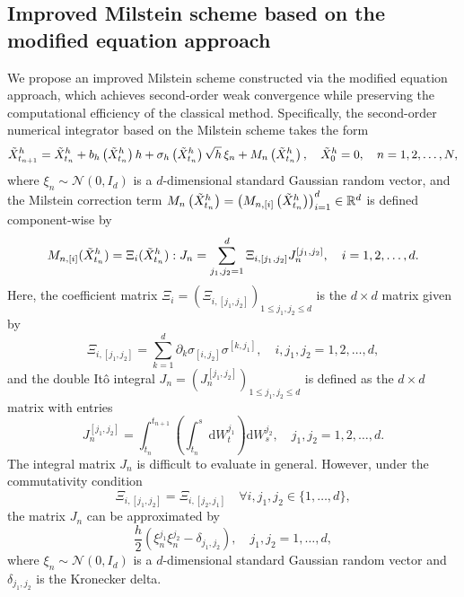 \documentclass[12pt,a4paper,reqno]{amsart}
\numberwithin{equation}{section}
\begin{document}
  

\subsection{Improved Milstein scheme based on the modified equation approach}

We propose an improved Milstein scheme constructed via the modified equation approach, which achieves second-order weak convergence while preserving the computational efficiency of the classical method. Specifically, the second-order numerical integrator based on the Milstein scheme takes the form 
\begin{equation}\label{Euler Maruyama with modified equation}
    \Tilde{X}_{t_{n+1}}^h = \Tilde{X}_{t_{n}}^h + b_{h}\left(\Tilde{X}_{t_{n}}^h\right)h + \sigma_{h}\left(\Tilde{X}_{t_n}^h\right)\sqrt{h}\,\xi_n + M_n\left(\Tilde{X}_{t_n}^h\right),\quad \tilde{X}_{0}^h = 0,\quad n= 1,2,\dotsc,N,
\end{equation}
where 
$\xi_n \sim \mathcal{N}(0,I_d)$ is a $d$-dimensional standard Gaussian random  vector, and the Milstein correction term $M_n\left(\Tilde{X}_{t_{n}}^h\right) = \left(M_{n,[i]}\left(\Tilde{X}_{t_{n}}^h\right)\right)_{i=1}^d \in \mathbb{R}^d$ is defined component-wise by
\begin{equation*}
    M_{n,[i]}(\Tilde{X}_{t_n}^h)  = \Xi_i(\Tilde{X}_{t_n}^h) : J_n = \sum_{j_1,j_2=1}^d \Xi_{i,[j_1,j_2]}J_n^{[j_1,j_2]},\quad i = 1,2,\dotsc,d.
\end{equation*}
Here, the coefficient matrix $\Xi_i = (\Xi_{i,[j_1,j_2]})_{1\leq j_1,j_2\leq d}$ is the $d\times d$ matrix given by
\begin{equation*}
    \Xi_{i,[j_1,j_2]} = \sum_{k=1}^d \partial_k\sigma_{[i,j_2]}\sigma^{[k,j_1]},\quad i,j_1,j_2 = 1,2,\dotsc,d,
\end{equation*}
and the double It\^{o} integral $J_n = (J_n^{[j_1,j_2]})_{1\leq j_1,j_2\leq d}$ is defined as the $d \times d$ matrix with entries  
\begin{equation*}
    J_n^{[j_1,j_2]} =  \int_{t_n}^{t_{n+1}}\left(\int_{t_n}^s \mathrm{d}W^{j_1}_t\right) \mathrm{d}W^{j_2}_s,\quad j_1,j_2 = 1,2,\dotsc,d.
\end{equation*}
The integral matrix $J_n$ is difficult to evaluate in general. However, under the commutativity condition
\begin{equation*}
	\Xi_{i,[j_1,j_2]} = \Xi_{i,[j_2,j_1]} \quad \forall i,j_1,j_2 \in \{1,\dots,d\},
\end{equation*}
the matrix $J_n$ can be approximated by
\begin{equation*}
 \frac{h}{2}\left(\xi_n^{j_1}\xi_n^{j_2} - \delta_{j_1,j_2}\right), \quad j_1,j_2 = 1,\dots,d,
\end{equation*}
where $\xi_n \sim \mathcal{N}(0,I_d)$ is a $d$-dimensional standard Gaussian random vector and $\delta_{j_1,j_2}$ is the Kronecker delta. 
\end{document}
